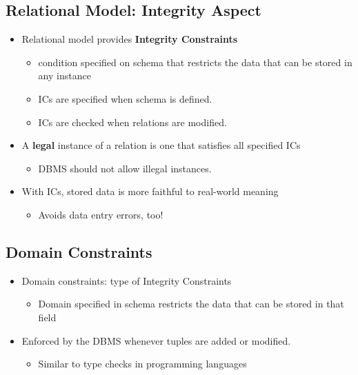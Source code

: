\documentclass[11pt]{article}
\begin{document}
\subsection{Relational Model: Integrity Aspect}
\label{sec:org291605e}
\begin{itemize}
\item Relational model provides \textbf{Integrity Constraints}
\begin{itemize}
\item condition specified on schema that restricts the data that can be stored in any instance
\item ICs are specified when schema is defined.
\item ICs are checked when relations are modified.
\end{itemize}
\item A \textbf{legal} instance of a relation is one that satisfies all specified ICs
\begin{itemize}
\item DBMS should not allow illegal instances.
\end{itemize}
\item With ICs, stored data is more faithful to real-world meaning
\begin{itemize}
\item Avoids data entry errors, too!
\end{itemize}
\end{itemize}
\subsection{Domain Constraints}
\label{sec:org231ec5c}
\begin{itemize}
\item Domain constraints: type of Integrity Constraints
\begin{itemize}
\item Domain specified in schema restricts the data that can be stored in that field
\end{itemize}
\item Enforced by the DBMS whenever tuples are added or modified.
\begin{itemize}
\item Similar to type checks in programming languages
\end{itemize}
\end{itemize}
\end{document}
